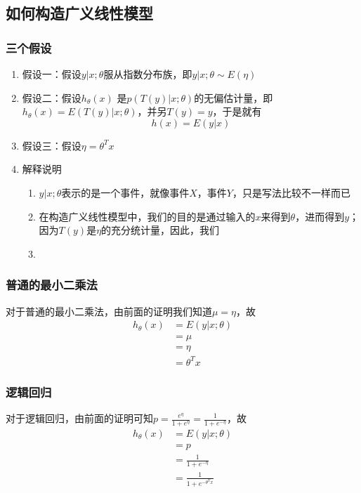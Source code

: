 \subsection{如何构造广义线性模型}
\subsubsection{三个假设}
\begin{enumerate}
	\item 假设一：假设$y|x; \theta$服从指数分布族，即$y|x; \theta \sim E(\eta)$
	\item 假设二：假设$h_\theta(x)$ 是$p\left(T(y)|x; \theta\right)$的无偏估计量，即$h_\theta(x)=E\left(T(y)|x; \theta\right)$，并另$T(y)=y$，于是就有
	\begin{equation}
		h(x) = E(y|x)
	\end{equation}
	{\color{red}{对此条假设还待更进一步的理解}}
	\item 假设三：假设$\eta = \theta^Tx$
	\item 解释说明
	\begin{enumerate}
		\item $y|x; \theta$表示的是一个事件，就像事件$X$，事件$Y$，只是写法比较不一样而已
		\item 在构造广义线性模型中，我们的目的是通过输入的$x$来得到$\theta$，进而得到$y$；因为$T(y)$是$\eta$的充分统计量，因此，我们
		\item 
	\end{enumerate}
\end{enumerate}

\subsubsection{普通的最小二乘法}
对于普通的最小二乘法，由前面的证明我们知道$\mu = \eta$，故
\begin{equation}\begin{aligned}
	h_\theta(x) &= E(y|x;\theta) \\
	&= \mu \\
	&= \eta \\
	&= \theta^T x
\end{aligned}\end{equation}

\subsubsection{逻辑回归}
对于逻辑回归，由前面的证明可知$p=\frac{e^{\eta}}{1+e^{\eta}} = \frac{1}{1+e^{-\eta}}$，故
\begin{equation}\begin{aligned}
	h_\theta(x) &= E(y|x; \theta) \\
	&= p \\
	&= \frac{1}{1+e^{-\eta}} \\
	&= \frac{1}{1+e^{-\theta^Tx}}
\end{aligned}\end{equation}




% 




















